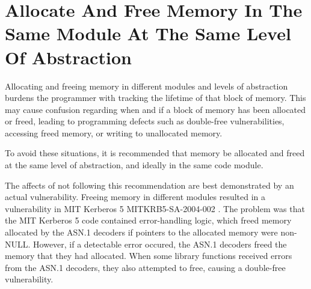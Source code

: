 %
%

\section{Allocate And Free Memory In The Same Module At The Same Level Of Abstraction}
\label{AllocateAndFreeMemoryInTheSameModuleAtTheSameLevelOfAbstraction::overview}

Allocating and freeing memory in different modules and levels of abstraction
burdens the programmer with tracking the lifetime of that block of memory. This
may cause confusion regarding when and if a block of memory has been allocated
or freed, leading to programming defects such as double-free vulnerabilities,
accessing freed memory, or writing to unallocated memory.

To avoid these situations, it is recommended that memory be allocated and freed
at the same level of abstraction, and ideally in the same code module.

The affects of not following this recommendation are best demonstrated by an
actual vulnerability. Freeing memory in different modules resulted in a
vulnerability in MIT Kerberos 5 MITKRB5-SA-2004-002 . The problem was that the
MIT Kerberos 5 code contained error-handling logic, which freed memory allocated
by the ASN.1 decoders if pointers to the allocated memory were non-NULL.
However, if a detectable error occured, the ASN.1 decoders freed the memory that
they had allocated. When some library functions received errors from the ASN.1
decoders, they also attempted to free, causing a double-free vulnerability.

